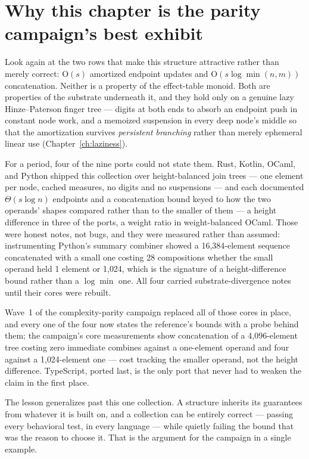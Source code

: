 \documentclass[11pt,twoside,openright]{book}
\newcommand{\bigoh}[1]{$\mathrm{O}(#1)$}
\begin{document}
\section{Why this chapter is the parity campaign's best exhibit}

Look again at the two rows that make this structure attractive rather than merely
correct: \bigoh{s} amortized endpoint updates and \bigoh{s \log \min(n,m)}
concatenation. Neither is a property of the effect-table monoid. Both are
properties of the substrate underneath it, and they hold only on a genuine lazy
Hinze--Paterson finger tree --- digits at both ends to absorb an endpoint push in
constant node work, and a memoized suspension in every deep node's middle so that
the amortization survives \emph{persistent branching} rather than merely
ephemeral linear use (Chapter~\ref{ch:laziness}).

For a period, four of the nine ports could not state them. Rust, Kotlin, OCaml,
and Python shipped this collection over height-balanced join trees --- one element
per node, cached measures, no digits and no suspensions --- and each documented
$\Theta(s \log n)$ endpoints and a concatenation bound keyed to how the two
operands' shapes compared rather than to the smaller of them --- a height
difference in three of the ports, a weight ratio in weight-balanced
OCaml. Those were honest notes, not bugs, and they were
measured rather than assumed: instrumenting Python's summary combiner showed a
16{,}384-element sequence concatenated with a small one costing 28 compositions
whether the small operand held 1 element or 1{,}024, which is the signature of a
height-difference bound rather than a $\log \min$ one. All four carried
substrate-divergence notes until their cores were rebuilt.

Wave~1 of the complexity-parity campaign replaced all of those cores in place,
and every one of the four now states the reference's bounds with a probe behind
them; the campaign's core measurements show concatenation of a 4{,}096-element
tree costing zero immediate combines against a one-element operand and four
against a 1{,}024-element one --- cost tracking the smaller operand, not the
height difference. TypeScript, ported last, is the only port that never had to
weaken the claim in the first place.

The lesson generalizes past this one collection. A structure inherits its
guarantees from whatever it is built on, and a collection can be entirely correct
--- passing every behavioral test, in every language --- while quietly failing the
bound that was the reason to choose it. That is the argument for the campaign in a
single example.
\end{document}
